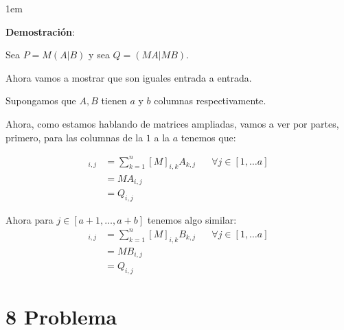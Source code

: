 \documentclass[12pt, fleqn]{article}                             %
\newenvironment{SmallIndentation}[1][0.75em]                    %
        {\begin{adjustwidth}{#1}{}\begin{footnotesize}}             %
        {\end{footnotesize}\end{adjustwidth}}                       %
\DeclareMathOperator \Space {\quad}                             %
\theoremstyle{break}                                            %
\begin{document}
    \begin{SmallIndentation}[1em]
        \textbf{Demostración}:
        
        Sea $P = M(A | B)$ y sea $Q = (MA | MB)$. 

        Ahora vamos a mostrar que son iguales entrada a entrada.

        Supongamos que $A, B$ tienen $a$ y $b$ columnas respectivamente.

        \begin{multicols}{2}

            Ahora, como estamos hablando de matrices ampliadas, vamos a ver
            por partes, primero, para las columnas de la $1$ a la $a$ tenemos que:

            \begin{align*}
                [P]_{i, j} 
                    &= \sum_{k = 1}^n [M]_{i, k}A_{k, j}   \Space \forall j \in [1, \dots a]    \\
                    &= MA_{i, j}                                                                \\
                    &= Q_{i, j}
            \end{align*}

            Ahora para $j \in [a + 1, \dots, a + b]$ tenemos algo similar:
            \begin{align*}
                [P]_{i, j} 
                    &= \sum_{k = 1}^n [M]_{i, k}B_{k, j}   \Space \forall j \in [1, \dots a]    \\
                    &= MB_{i, j}                                                                \\
                    &= Q_{i, j}
            \end{align*}

        \end{multicols}

            
    
    \end{SmallIndentation}
        

\clearpage
\section{8 Problema}
\end{document}
